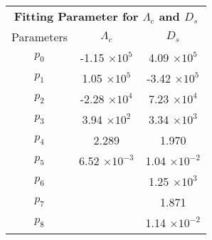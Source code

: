 \documentclass[12pt,oneside,reqno]{amsart}
\begin{document}
\vspace{1cm} \normalsize \begin{center}


\begin{tabular}{ |c|c|c| } 



\cline{1-3}
\multicolumn{3}{|c|}{\textbf{Fitting Parameter for $\Lambda_c$ and $D_s$} }\\
 \cline{1-3}
 Parameters    & $\Lambda_c$  & $D_s$ \\
            \cline{1-3}
$p_0$ & -1.15 $\times 10^5$ & 4.09 $\times 10^5$  \\
\hline 
$p_1$ & 1.05 $\times 10^5$ & -3.42 $\times 10^5$ \\
\hline
$p_2$ & -2.28 $\times 10^4$ & 7.23 $\times 10^4$ \\
\hline
$p_3$ & 3.94 $\times 10^2$ & 3.34 $\times 10^3$  \\
\hline
$p_4$ & 2.289 & 1.970 \\
\hline
$p_5$ &  6.52 $\times 10^{-3}$ & 1.04 $\times 10^{-2}$ \\
\hline
$p_6$ &   & 1.25 $\times 10^{3}$ \\
\hline
$p_7$ &  & 1.871 \\
\hline
$p_8$ &   & 1.14 $\times 10^{-2}$ \\
\hline

\end{tabular}
\end{center}
\end{document}
